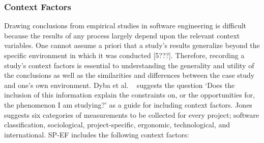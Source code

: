 
\subsubsection{Context Factors}
\label{sec:model_cf}

Drawing conclusions from empirical studies in software engineering is difficult because the results of  any process largely depend upon the relevant context variables. One cannot assume a priori that a study’s results generalize beyond the specific environment in which it was conducted [5???]. Therefore, recording a study’s context factors is essential to understanding the generality and utility of the conclusions as well as the similarities and differences between the case study and one’s own environment. Dyba et al. ~\cite{dyba2012what} suggests the question `Does the inclusion of this information explain the constraints on, or the opportunities for, the phenomenon I am studying?' as a guide for including context factors. Jones~\cite{jones2000software} suggests six categories of measurements to be collected for every project; software classification, sociological, project-specific, ergonomic, technological, and international. SP-EF includes the following context factors:
